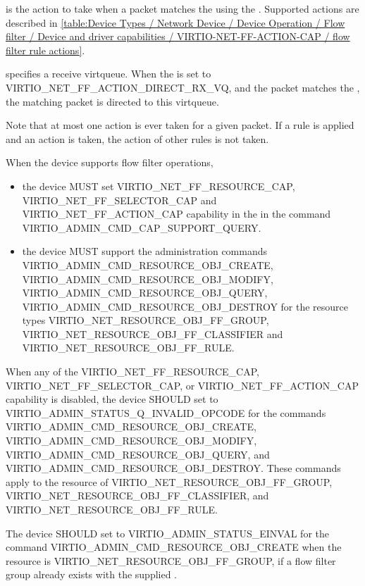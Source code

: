  is the action to take when a packet matches the
 using the . Supported actions are described in
\ref{table:Device Types / Network Device / Device Operation / Flow filter / Device and driver capabilities / VIRTIO-NET-FF-ACTION-CAP / flow filter rule actions}.

 specifies a receive virtqueue. When the  is set
to VIRTIO_NET_FF_ACTION_DIRECT_RX_VQ, and the packet matches the ,
the matching packet is directed to this virtqueue.

Note that at most one action is ever taken for a given packet. If a rule is
applied and an action is taken, the action of other rules is not taken.


When the device supports flow filter operations,
\begin{itemize}
\item the device MUST set VIRTIO_NET_FF_RESOURCE_CAP, VIRTIO_NET_FF_SELECTOR_CAP
and VIRTIO_NET_FF_ACTION_CAP capability in the  in the
command VIRTIO_ADMIN_CMD_CAP_SUPPORT_QUERY.
\item the device MUST support the administration commands
VIRTIO_ADMIN_CMD_RESOURCE_OBJ_CREATE,
VIRTIO_ADMIN_CMD_RESOURCE_OBJ_MODIFY, VIRTIO_ADMIN_CMD_RESOURCE_OBJ_QUERY,
VIRTIO_ADMIN_CMD_RESOURCE_OBJ_DESTROY for the resource types
VIRTIO_NET_RESOURCE_OBJ_FF_GROUP, VIRTIO_NET_RESOURCE_OBJ_FF_CLASSIFIER and
VIRTIO_NET_RESOURCE_OBJ_FF_RULE.
\end{itemize}

When any of the VIRTIO_NET_FF_RESOURCE_CAP, VIRTIO_NET_FF_SELECTOR_CAP, or
VIRTIO_NET_FF_ACTION_CAP capability is disabled, the device SHOULD set
 to VIRTIO_ADMIN_STATUS_Q_INVALID_OPCODE for the commands
VIRTIO_ADMIN_CMD_RESOURCE_OBJ_CREATE,
VIRTIO_ADMIN_CMD_RESOURCE_OBJ_MODIFY, VIRTIO_ADMIN_CMD_RESOURCE_OBJ_QUERY,
and VIRTIO_ADMIN_CMD_RESOURCE_OBJ_DESTROY. These commands apply to the resource
 of VIRTIO_NET_RESOURCE_OBJ_FF_GROUP, VIRTIO_NET_RESOURCE_OBJ_FF_CLASSIFIER, and
VIRTIO_NET_RESOURCE_OBJ_FF_RULE.

The device SHOULD set  to VIRTIO_ADMIN_STATUS_EINVAL for the
command VIRTIO_ADMIN_CMD_RESOURCE_OBJ_CREATE when the resource 
is VIRTIO_NET_RESOURCE_OBJ_FF_GROUP, if a flow filter group already exists
with the supplied .

